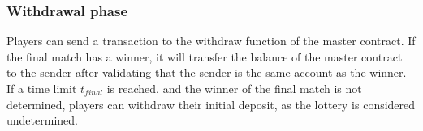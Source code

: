 \subsubsection{Withdrawal phase}
Players can send a transaction to the withdraw function of the master contract. If the final match has a winner, it will transfer the balance of the master contract to the sender after validating that the sender is the same account as the winner. If a time limit $t_{final}$ is reached, and the winner of the final match is not determined, players can withdraw their initial deposit, as the lottery is considered undetermined.
